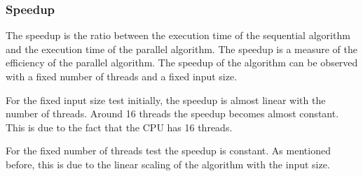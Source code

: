 \subsubsection*{Speedup}

The speedup is the ratio between the execution time of the sequential algorithm and the execution 
time of the parallel algorithm. The speedup is a measure of the efficiency of the parallel algorithm.
The speedup of the algorithm can be observed with a fixed number of threads and a fixed input size.


For the fixed input size test initially, the speedup is almost linear with the number of threads. 
Around 16 threads the speedup becomes almost constant. This is due to the fact that the CPU has 16
threads.  

\begin{center}
\end{center}

For the fixed number of threads test the speedup is constant. As mentioned before, this is due to 
the linear scaling of the algorithm with the input size.

